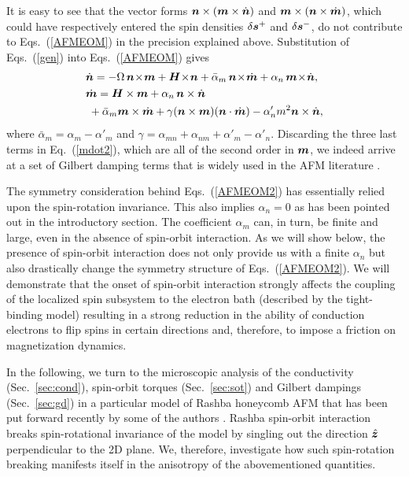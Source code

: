 It is easy to see that the vector forms $\boldsymbol{n}\times(\boldsymbol{m}\times\dot{\boldsymbol{n}})$ and $\boldsymbol{m}\times(\boldsymbol{n}\times \dot{\boldsymbol{m}})$, which could have respectively entered the spin densities $\delta\boldsymbol{s}^+$ and $\delta\boldsymbol{s}^-$, do not contribute to Eqs.~(\ref{AFMEOM}) in the precision explained above.  
Substitution of Eqs.~(\ref{gen}) into Eqs.~(\ref{AFMEOM}) gives 
\beml
\label{AFMEOM2}
\begin{align}
\label{ndot2}
&\dot{\bb{n}} = -\Omega\, \bb{n}\!\times\!\bb{m} +\bb{H}\!\times\!\bb{n}+\bar{\alpha}_m\,\bb{n}\!\times\!\dot{\bb{m}}+\alpha_n\,\bb{m}\!\times\! \dot{\bb{n}},\\
\label{mdot2}
&\dot{\bb{m}} =\bb{H}\times\bb{m}+\alpha_n\,\bb{n} \times \dot{\bb{n}}\n\\
&\;+\bar{\alpha}_m \bb{m} \times \dot{\bb{m}} +\gamma (\bb{n}\times\bb{m})(\bb{n}\cdot\dot{\bb{m}}) - \alpha_n'm^2\bb{n}\times\dot{\bb{n}} ,
\end{align}
\eml
where $\bar{\alpha}_m=\alpha_m\!-\!\alpha'_m$ and $\gamma=\alpha_{mn}\!+\!\alpha_{nm}\!+\!\alpha'_m\!-\!\alpha'_n$. Discarding the three last terms in Eq.~(\ref{mdot2}), which are all of the second order in $\boldsymbol{m}$, we indeed arrive at a set of Gilbert damping terms that is  widely used in the AFM literature \cite{Kamra2018,PhysRevMaterials.1.061401,Yuan_2019}. 

The symmetry consideration behind Eqs.~(\ref{AFMEOM2}) has essentially relied upon the spin-rotation invariance. This also implies $\alpha_n=0$ as has been pointed out in the introductory section. The coefficient $\alpha_m$ can, in turn, be finite and large, even in the absence of spin-orbit interaction. As we will show below, the presence of spin-orbit interaction does not only provide us with a finite $\alpha_n$ but also drastically change the symmetry structure of Eqs.~(\ref{AFMEOM2}). We will demonstrate that the onset of spin-orbit interaction strongly affects the coupling of the localized spin subsystem to the electron bath (described by the tight-binding model) resulting in a strong reduction in the ability of conduction electrons to flip spins in certain directions and, therefore, to impose a friction on magnetization dynamics. 

In the following, we turn to the microscopic analysis of the conductivity (Sec.~\ref{sec:cond}), spin-orbit torques (Sec.~\ref{sec:sot}) and Gilbert dampings (Sec.~\ref{sec:gd}) in a particular model of Rashba honeycomb AFM that has been put forward recently by some of the authors \cite{Sumit2019}. Rashba spin-orbit interaction breaks spin-rotational invariance of the model by singling out the direction $\hat{\boldsymbol{z}}$ perpendicular to the 2D plane. We, therefore, investigate how such spin-rotation breaking manifests itself in the anisotropy of the abovementioned quantities.  

